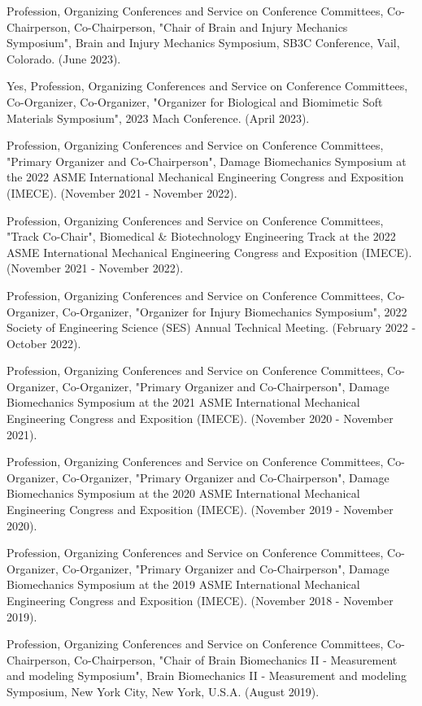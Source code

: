 \documentclass[
]{article}
\begin{document}
Profession, Organizing Conferences and Service on Conference Committees,
Co-Chairperson, Co-Chairperson, "Chair of Brain and Injury Mechanics
Symposium", Brain and Injury Mechanics Symposium, SB3C Conference, Vail,
Colorado. (June 2023).

Yes, Profession, Organizing Conferences and Service on Conference
Committees, Co-Organizer, Co-Organizer, "Organizer for Biological and
Biomimetic Soft Materials Symposium", 2023 Mach Conference. (April
2023).

Profession, Organizing Conferences and Service on Conference Committees,
"Primary Organizer and Co-Chairperson", Damage Biomechanics Symposium at
the 2022 ASME International Mechanical Engineering Congress and
Exposition (IMECE). (November 2021 - November 2022).

Profession, Organizing Conferences and Service on Conference Committees,
"Track Co-Chair", Biomedical \& Biotechnology Engineering Track at the
2022 ASME International Mechanical Engineering Congress and Exposition
(IMECE). (November 2021 - November 2022).

Profession, Organizing Conferences and Service on Conference Committees,
Co-Organizer, Co-Organizer, "Organizer for Injury Biomechanics
Symposium", 2022 Society of Engineering Science (SES) Annual Technical
Meeting. (February 2022 - October 2022).

Profession, Organizing Conferences and Service on Conference Committees,
Co-Organizer, Co-Organizer, "Primary Organizer and Co-Chairperson",
Damage Biomechanics Symposium at the 2021 ASME International Mechanical
Engineering Congress and Exposition (IMECE). (November 2020 - November
2021).

Profession, Organizing Conferences and Service on Conference Committees,
Co-Organizer, Co-Organizer, "Primary Organizer and Co-Chairperson",
Damage Biomechanics Symposium at the 2020 ASME International Mechanical
Engineering Congress and Exposition (IMECE). (November 2019 - November
2020).

Profession, Organizing Conferences and Service on Conference Committees,
Co-Organizer, Co-Organizer, "Primary Organizer and Co-Chairperson",
Damage Biomechanics Symposium at the 2019 ASME International Mechanical
Engineering Congress and Exposition (IMECE). (November 2018 - November
2019).

Profession, Organizing Conferences and Service on Conference Committees,
Co-Chairperson, Co-Chairperson, "Chair of Brain Biomechanics II -
Measurement and modeling Symposium", Brain Biomechanics II - Measurement
and modeling Symposium, New York City, New York, U.S.A. (August 2019).
\end{document}
